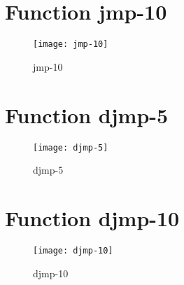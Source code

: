\newpage

\section{Function jmp-10}

\begin{center}

\end{center}

\begin{center}

\end{center}

\begin{figure}[h]
\begin{center}
\texttt{[image: jmp-10]}
\caption{jmp-10}
\end{center}
\end{figure}

\newpage

\section{Function djmp-5}

\begin{center}

\end{center}

\begin{center}

\end{center}

\begin{figure}[h]
\begin{center}
\texttt{[image: djmp-5]}
\caption{djmp-5}
\end{center}
\end{figure}

\newpage

\section{Function djmp-10}

\begin{center}

\end{center}

\begin{center}

\end{center}

\begin{figure}[h]
\begin{center}
\texttt{[image: djmp-10]}
\caption{djmp-10}
\end{center}
\end{figure}

